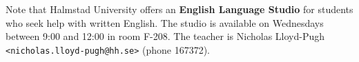 \documentclass[a4paper,10pt]{article}
\begin{document}
\begin{description}
  Note that Halmstad University offers an \textbf{English Language Studio} for students who seek help with written English.
  The studio is available on Wednesdays between 9:00 and 12:00 in room F-208.
  The teacher is Nicholas Lloyd-Pugh \texttt{<nicholas.lloyd-pugh@hh.se>} (phone 167372).
  
\end{description}
\end{document}
